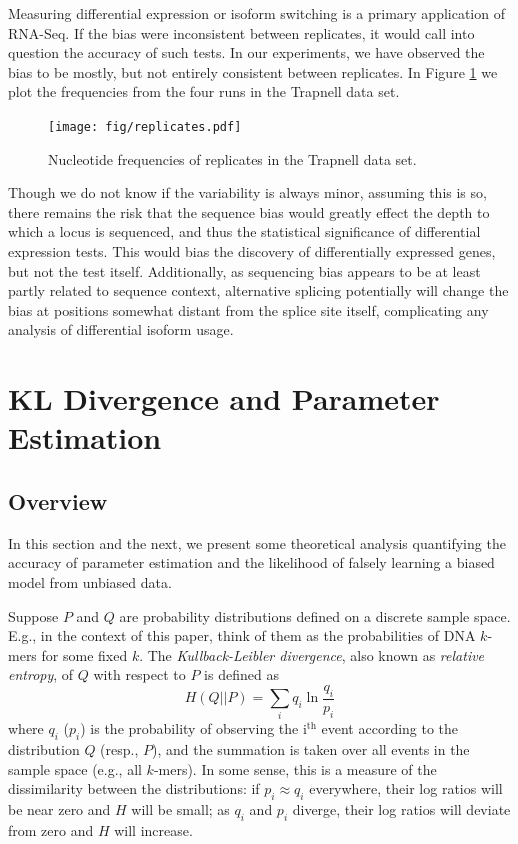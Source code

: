 \documentclass[letterpaper]{article}
\begin{document}
Measuring differential expression or isoform switching is a primary application of
RNA-Seq. If the bias were inconsistent between replicates, it would call into
question the accuracy of such tests. In our experiments, we have observed the
bias to be mostly, but not entirely consistent between replicates. In Figure
\ref{fig:replicates} we
plot the frequencies from the four runs in the Trapnell data set.

\begin{figure}[H]
\begin{center}
\texttt{[image: fig/replicates.pdf]}
\end{center}
\caption{Nucleotide frequencies of replicates in the Trapnell data set.}
\label{fig:replicates}
\end{figure}

Though we do not know if the variability is always minor, assuming this is so,
there remains the risk that the sequence bias would greatly effect the depth to
which a locus is sequenced, and thus the statistical significance of
differential expression tests. This would bias the discovery of differentially
expressed genes, but not the test itself.  Additionally, as sequencing bias
appears to be at least partly related to sequence context, alternative splicing
potentially will change the bias at positions somewhat distant from the splice
site itself, complicating any analysis of differential isoform usage.


\section{KL Divergence and Parameter Estimation}

\subsection{Overview}

In this section and the next, we present some theoretical analysis quantifying
the accuracy of parameter estimation and the likelihood of falsely learning a
biased model from unbiased data.

Suppose $P$ and $Q$ are probability distributions defined on a discrete sample
space. E.g., in the context of this paper, think of them as the probabilities of
DNA $k$-mers for some fixed $k$. The \emph{Kullback-Leibler divergence}, also
known as \emph{relative entropy}, of $Q$ with respect to $P$ is defined as
$$H(Q||P) = \sum_{i} q_i \ln \frac{q_{i}}{p_{i}}$$
where $q_{i}$ ($p_{i}$) is the probability of observing the i$^{\text{th}}$
event according to the distribution $Q$ (resp., $P$), and the summation is taken
over all events in the sample space (e.g., all $k$-mers). In some sense, this is
a measure of the dissimilarity between the distributions: if $p_{i} \approx
q_{i}$ everywhere, their log ratios will be near zero and $H$ will be small; as
$q_{i}$ and $p_{i}$ diverge, their log ratios will deviate from zero and $H$
will increase.
\end{document}
